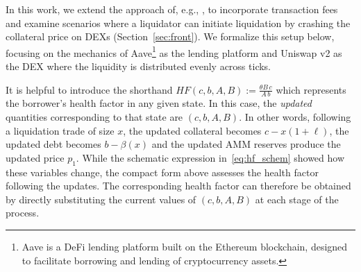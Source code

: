 \documentclass[11pt]{article} %
\begin{document}
In this work, we extend the approach of, e.g., \cite{cohen23}, to incorporate transaction fees and examine scenarios where a liquidator can initiate liquidation by crashing the collateral price on DEXs (Section~\ref{sec:front}). We formalize this setup below, focusing on the mechanics of Aave\footnote{Aave is a DeFi lending platform built on the Ethereum blockchain, designed to facilitate borrowing and lending of cryptocurrency assets.} as the lending platform and Uniswap v2 as the DEX where the liquidity is distributed evenly across ticks.

It is helpful to introduce the shorthand $HF(c,b,A,B) := \frac{\theta B\,c}{A\,b}$ which represents the borrower's health factor in any given state. In this case, the \emph{updated} quantities corresponding to that state are $(c,b,A,B)$. In other words, following a liquidation trade of size $x$, the updated collateral becomes $c - x(1+\ell)$, the updated debt becomes $b - \beta(x)$ and the updated AMM reserves produce the updated price $p_1$. While the schematic expression in~\eqref{eq:hf_schem} showed how these variables change, the compact form above assesses the health factor following the updates. The corresponding health factor can therefore be obtained by directly substituting the current values of $(c,b,A,B)$ at each stage of the process.
\end{document}
